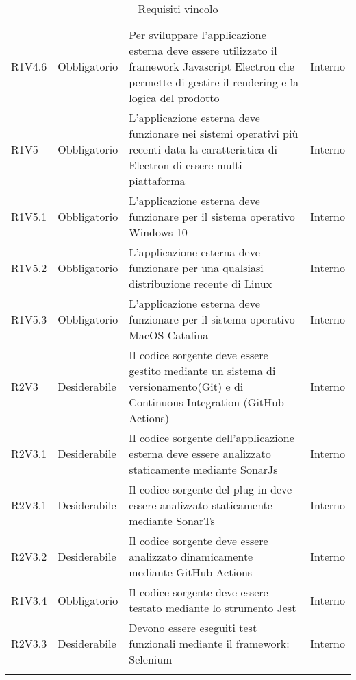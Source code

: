 \begin{longtable} {
		>{\centering}p{18mm} 
		>{\centering}p{28mm}
		>{}p{50mm} 
		>{}p{28mm}
		}
	R1V4.6 & 
	Obbligatorio & 
	Per sviluppare l'applicazione esterna deve essere utilizzato il framework Javascript Electron che permette di gestire il rendering e la logica del prodotto &
	Interno  \TBstrut \\ [2mm]
	
	R1V5 & 
	Obbligatorio & 
	L'applicazione esterna deve funzionare nei sistemi operativi più recenti data la caratteristica di Electron di essere multi-piattaforma & 
	Interno  \TBstrut \\ [2mm]

	R1V5.1 & 
	Obbligatorio & 
	L'applicazione esterna deve funzionare per il sistema operativo Windows 10 &
	Interno  \TBstrut \\ [2mm]

	R1V5.2 & 
	Obbligatorio & 
	L'applicazione esterna deve funzionare per una qualsiasi distribuzione recente di Linux &
	Interno  \TBstrut \\ [2mm]

	R1V5.3 & 
	Obbligatorio & 
	L'applicazione esterna deve funzionare per il sistema operativo MacOS Catalina &
	Interno  \TBstrut \\ [2mm]
		
	R2V3 &
	Desiderabile &
	Il codice sorgente deve essere gestito mediante un sistema di versionamento\glosp (Git) e di Continuous Integration (GitHub Actions) &
	Interno  \TBstrut \\ [2mm]		
	
	R2V3.1 &
	Desiderabile &
	Il codice sorgente dell'applicazione esterna deve essere analizzato staticamente mediante SonarJs\glo &
	Interno  \TBstrut \\ [2mm]
	
	R2V3.1 &
	Desiderabile &
	Il codice sorgente del plug-in deve essere analizzato staticamente mediante SonarTs\glo &
	Interno  \TBstrut \\ [2mm]
	
	R2V3.2 &
	Desiderabile &
	Il codice sorgente deve essere analizzato dinamicamente mediante GitHub Actions &
	Interno  \TBstrut \\ [2mm]
	
	R1V3.4 &
	Obbligatorio &
	Il codice sorgente deve essere testato mediante lo strumento Jest &
	Interno  \TBstrut \\ [2mm]
	
	R2V3.3 &
	Desiderabile &
	Devono essere eseguiti test funzionali mediante il framework: Selenium &
	Interno  \TBstrut \\ [2mm]
	
	\rowcolor{white}
	\caption{Requisiti vincolo}
\end{longtable}
